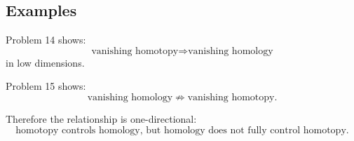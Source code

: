 \documentclass[12pt,a4paper]{article}
\theoremstyle{notespace}
\begin{document}
\subsection*{Examples}

Problem 14 shows:
\[
\text{vanishing homotopy}
\Longrightarrow
\text{vanishing homology}
\]
in low dimensions.

Problem 15 shows:
\[
\text{vanishing homology}
\not\Longrightarrow
\text{vanishing homotopy}.
\]

Therefore the relationship is one-directional:
\[
\boxed{
	\text{homotopy controls homology, but homology does not fully control homotopy.}
}
\]
\end{document}
